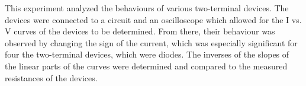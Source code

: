 
\physics

\begin{paperabs}

	This experiment analyzed the behaviours of various two-terminal devices. The devices were connected to a circuit and an oscilloscope which allowed for the I vs. V curves of the devices to be determined. From there, their behaviour was observed by changing the sign of the current, which was especially significant for four the two-terminal devices, which were diodes. The inverses of the slopes of the linear parts of the curves were determined and compared to the measured resistances of the devices.
	
\end{paperabs}

